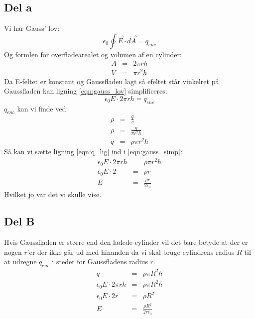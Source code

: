 \subsection{Del a} %
\label{sub:del_a}
Vi har Gauss' lov:
\begin{equation}
	\label{eqn:gauss_lov}
	\epsilon _0 \oint \vec{E} \cdot d\vec{A} = q_{enc}
\end{equation}
Og formlen for overfladearealet og volumen af en cylinder:
\begin{eqnarray}
	A &=& 2\pi rh \\
	V &=& \pi r^2 h
\end{eqnarray}
Da E-feltet er konstant og Gaussfladen lagt så efeltet står vinkelret på Gaussfladen kan ligning \ref{eqn:gauss_lov} simplificeres:
\begin{equation}
	\label{eqn:gauss_simp}
	\epsilon _0 E \cdot 2\pi rh = q_{enc}
\end{equation}
$q_{enc}$ kan vi finde ved:
\begin{eqnarray}
	\label{eqn:q_lig}
	\rho &=& \frac{q}{v} \nonumber \\
	\rho &=& \frac{q}{\pi r^2 h} \nonumber \\
	q &=& \rho \pi r^2 h
\end{eqnarray}
Så kan vi sætte ligning \ref{eqn:q_lig} ind i \ref{eqn:gauss_simp}:
\begin{eqnarray}
	\epsilon _0 E \cdot 2\pi rh &=& \rho \pi r^2 h \nonumber \\
	\epsilon _0 E \cdot 2 &=& \rho r \nonumber \\
	E &=& \frac{\rho r}{2\epsilon _0}
\end{eqnarray}
Hvilket jo var det vi skulle vise.
\newpage

\subsection{Del B} %
\label{sub:del_b}
Hvis Gaussfladen er større end den ladede cylinder vil det bare betyde at der er nogen $r$'er der ikke går ud med hinanden da vi skal bruge cylindrens radius $R$  til at udregne $q_{enc}$ i stedet for Gaussfladens radius $r$.
\begin{eqnarray}
	q &=& \rho \pi R^2 h \nonumber \\
	\epsilon _0 E \cdot 2\pi rh &=& \rho \pi R^2 h \nonumber \\
	\epsilon _0 E \cdot 2r &=& \rho R^2 \nonumber \\
	E &=& \frac{\rho R^2}{2r\epsilon _0}
\end{eqnarray}
